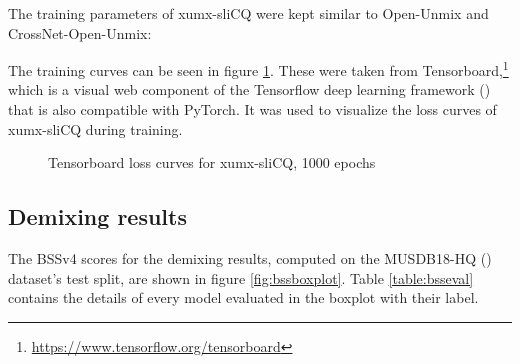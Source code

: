 \documentclass[report.tex]{subfiles}
\begin{document}
The training parameters of xumx-sliCQ were kept similar to Open-Unmix and CrossNet-Open-Unmix:

The training curves can be seen in figure \ref{fig:networkloss}. These were taken from Tensorboard,\footnote{\url{https://www.tensorflow.org/tensorboard}} which is a visual web component of the Tensorflow deep learning framework (\cite{tensorflow, tensorflowsoft}) that is also compatible with PyTorch. It was used to visualize the loss curves of xumx-sliCQ during training.

\begin{figure}[ht]
	\centering
	\hspace{0.5em}
	\caption{Tensorboard loss curves for xumx-sliCQ, 1000 epochs}
	\label{fig:networkloss}
\end{figure}

\subsection{Demixing results}

The BSSv4 scores for the demixing results, computed on the MUSDB18-HQ (\cite{musdb18hq}) dataset's test split, are shown in figure \ref{fig:bssboxplot}. Table \ref{table:bsseval} contains the details of every model evaluated in the boxplot with their label.
\end{document}
